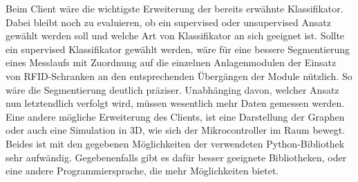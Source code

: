 Beim Client wäre die wichtigste Erweiterung der bereits erwähnte Klassifikator. Dabei bleibt noch zu evaluieren, ob ein supervised oder unsupervised Ansatz gewählt werden soll und welche Art von Klassifikator an sich geeignet ist. Sollte ein supervised Klassifikator gewählt werden, wäre für eine bessere Segmentierung eines Messlaufs mit Zuordnung auf die einzelnen Anlagenmodulen der Einsatz von RFID-Schranken an den entsprechenden Übergängen der Module nützlich. So wäre die Segmentierung deutlich präziser. Unabhänging davon, welcher Ansatz nun letztendlich verfolgt wird, müssen wesentlich mehr Daten gemessen werden.
Eine andere mögliche Erweiterung des Clients, ist eine Darstellung der Graphen oder auch eine Simulation in 3D, wie sich der Mikrocontroller im Raum bewegt. Beides ist mit den gegebenen Möglichkeiten der verwendeten Python-Bibliothek sehr aufwändig. Gegebenenfalls gibt es dafür besser geeignete Bibliotheken, oder eine andere Programmiersprache, die mehr Möglichkeiten bietet.